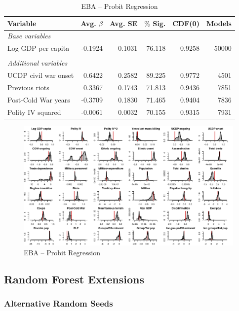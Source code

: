 \begin{table}[H]
\centering
\begin{tabular}{lrrrrr}
\hline
\textbf{Variable} & \textbf{Avg. $\beta$} & \textbf{Avg. SE} & \textbf{$\%$ Sig.} & \textbf{CDF(0)} & \textbf{Models} \\ \hline
\textit{Base variables} &  &  &  &  &  \\
Log GDP per capita & -0.1924 & 0.1031 & 76.118 & 0.9258 & 50000 \\
 &  &  &  &  &  \\
\textit{Additional variables} &  &  &  &  &  \\
UCDP civil war onset & 0.6422 & 0.2582 & 89.225 & 0.9772 & 4501 \\
Previous riots & 0.3367 & 0.1743 & 71.813 & 0.9436 & 7851 \\
Post-Cold War years & -0.3709 & 0.1830 & 71.465 & 0.9404 & 7836 \\
Polity IV squared & -0.0061 & 0.0032 & 70.155 & 0.9315 & 7931 \\ \hline
\end{tabular}
\caption{EBA -- Probit Regression}
\label{tab:eba1}
\end{table}

\clearpage
\begin{figure}
    \centering
    \includegraphics[width=\textwidth]{images/mk-probit.pdf}
    \caption{EBA -- Probit Regression}
    \label{fig:mk-probit}
\end{figure}
\clearpage

\subsection{Random Forest Extensions}
\label{sec:mk-rfe}

\subsubsection{Alternative Random Seeds}

